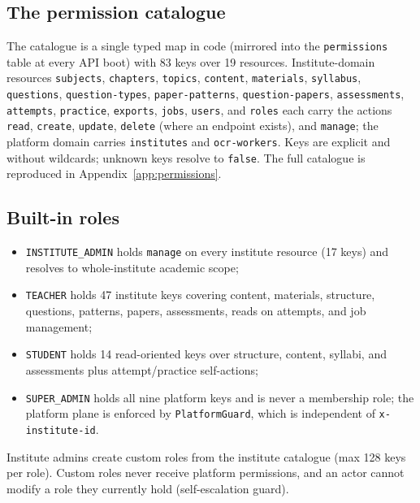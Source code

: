 \subsection{The permission catalogue}

\noindent The catalogue is a single typed map in code (mirrored into the
\texttt{permissions} table at every API boot) with 83 keys over 19 resources.
Institute-domain resources \texttt{subjects}, \texttt{chapters},
\texttt{topics}, \texttt{content}, \texttt{materials}, \texttt{syllabus},
\texttt{questions}, \texttt{question-types}, \texttt{paper-patterns},
\texttt{question-papers}, \texttt{assessments}, \texttt{attempts},
\texttt{practice}, \texttt{exports}, \texttt{jobs}, \texttt{users}, and
\texttt{roles} each carry the actions \texttt{read}, \texttt{create},
\texttt{update}, \texttt{delete} (where an endpoint exists), and
\texttt{manage}; the platform domain carries \texttt{institutes} and
\texttt{ocr-workers}. Keys are explicit and without wildcards; unknown keys
resolve to \texttt{false}. The full catalogue is reproduced in
Appendix~\ref{app:permissions}.

\subsection{Built-in roles}

\begin{itemize}
  \item \texttt{INSTITUTE\_ADMIN} holds \texttt{manage} on every institute
  resource (17 keys) and resolves to whole-institute academic scope;
  \item \texttt{TEACHER} holds 47 institute keys covering content,
  materials, structure, questions, patterns, papers, assessments, reads on
  attempts, and job management;
  \item \texttt{STUDENT} holds 14 read-oriented keys over structure, content,
  syllabi, and assessments plus attempt/practice self-actions;
  \item \texttt{SUPER\_ADMIN} holds all nine platform keys and is never a
  membership role; the platform plane is enforced by \texttt{PlatformGuard},
  which is independent of \texttt{x-institute-id}.
\end{itemize}

\noindent Institute admins create custom roles from the institute catalogue
(max 128 keys per role). Custom roles never receive platform permissions, and
an actor cannot modify a role they currently hold (self-escalation guard).

